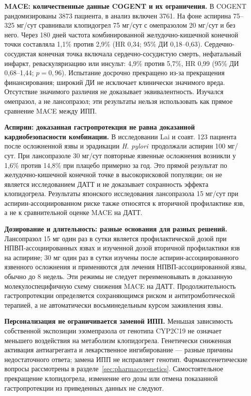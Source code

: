 \documentclass[11pt,a4paper,notitlepage]{report}
\newcommand{\Hp}{\textit{H. pylori}}
\newcommand{\src}[1]{\unskip\space\cite{#1}}
\begin{document}
\textbf{MACE: количественные данные COGENT и их ограничения.} В COGENT рандомизированы 3873 пациента, в анализ включен 3761. На фоне аспирина 75--325 мг/сут сравнивали клопидогрел 75 мг/сут с омепразолом 20 мг/сут и без него. Через 180 дней частота комбинированной желудочно-кишечной конечной точки составляла 1,1\% против 2,9\% (HR 0,34; 95\% ДИ 0,18--0,63). Сердечно-сосудистая конечная точка включала сердечно-сосудистую смерть, нефатальный инфаркт, реваскуляризацию или инсульт: 4,9\% против 5,7\%, HR 0,99 (95\% ДИ 0,68--1,44; $p=0{,}96$). Испытание досрочно прекращено из-за прекращения финансирования; широкий ДИ не исключает клинически значимого вреда. Отсутствие значимого различия не доказывает эквивалентность. Изучался омепразол, а не лансопразол; эти результаты нельзя использовать как прямое сравнение MACE между ИПП.\src{cardiocogent2010}

\textbf{Аспирин: доказанная гастропротекция не равна доказанной кардиобезопасности комбинации.} В исследовании Lai и соавт. 123 пациента после осложненной язвы и эрадикации \Hp\ продолжали аспирин 100 мг/сут. При лансопразоле 30 мг/сут повторные язвенные осложнения возникли у 1,6\% против 14,8\% при плацебо примерно за год. Это прямой результат по желудочно-кишечной конечной точке в высокорисковой популяции; он не является исследованием ДАТТ и не доказывает сохранность эффекта клопидогрела. Результаты японского исследования лансопразола 15 мг/сут при аспирин-ассоциированном риске также относятся к вторичной профилактике язв, а не к сравнительной оценке MACE на ДАТТ.\src{aspirintrial,aspirin15}

\textbf{Дозирование и длительность: разные основания для разных решений.} Лансопразол 15 мг один раз в сутки является профилактической дозой при НПВП-ассоциированных язвах и изученной дозой вторичной профилактики язв на аспирине; 30 мг один раз в сутки изучены после аспирин-ассоциированного язвенного осложнения и применяются для лечения НПВП-ассоциированной язвы, обычно до 8 недель. Эти режимы не следует переименовывать в доказанную молекулоспецифичную схему снижения MACE на ДАТТ. Продолжительность гастропротекции определяется сохраняющимся риском и антитромботической терапией, а не автоматически восьминедельным курсом заживления язвы.\src{uslabel,hpra,aspirin15,aspirintrial,cardioesc2024}

\textbf{Персонализация не ограничивается заменой ИПП.} Меньшая зависимость собственной экспозиции эзомепразола от генотипа CYP2C19 не означает меньшего воздействия на метаболизм клопидогрела. Генетически сниженная активация антиагреганта и лекарственное ингибирование --- разные причины недостаточного ответа; замена ИПП не исправляет генотип. Фармакогенетические вопросы рассмотрены в разделе~\ref{sec:pharmacogenetics}. Самостоятельное прекращение клопидогрела, изменение его дозы или отмена показанной гастропротекции из приведенных данных не следуют.\src{leonova2015,cardioplavix2025,agadepres}
\end{document}
